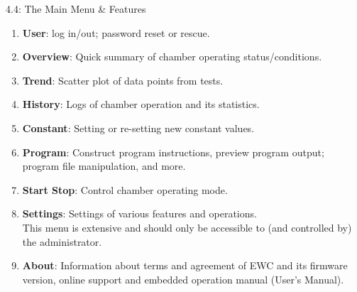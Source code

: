\documentclass{beamer}
\begin{document}
\begin{frame}{4.4: The Main Menu \& Features}{} 

\begin{enumerate}
   \item {\bf{User}}: log in/out; password reset or rescue.
   \item {\bf{Overview}}: Quick summary of chamber operating status/conditions.
   \item {\bf{Trend}}: Scatter plot of data points from tests.
   \item {\bf{History}}: Logs of chamber operation and its statistics.
   \item {\bf{Constant}}: Setting or re-setting new constant values.
   \item {\bf{Program}}: Construct program instructions, preview program output; program file manipulation, and more.
   \item {\bf{Start Stop}}: Control chamber operating mode.
   \item {\bf{Settings}}: Settings of various features and operations. \\ This menu is extensive and should only be accessible to (and controlled by) the administrator. 
   \item {\bf{About}}: Information about terms and agreement of EWC and its firmware version, online support and embedded operation manual (User's Manual).
\end{enumerate} 
\end{frame}
\end{document}
